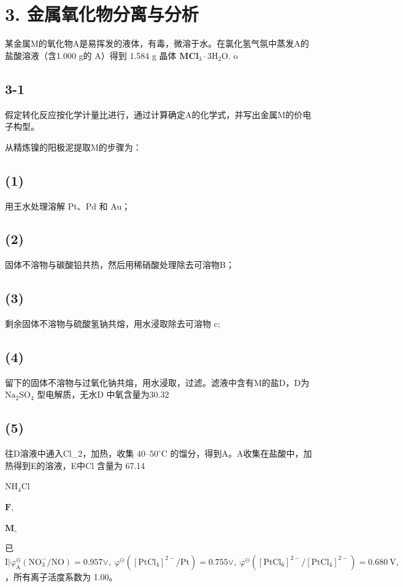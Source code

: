 \section*{3. 金属氧化物分离与分析}
某⾦属M的氧化物A是易挥发的液体，有毒，微溶于⽔。在氯化氢⽓氛中蒸发A的盐酸溶液（含1.000 g的 A）得到 1.584 g 晶体 $\mathbf { M C l } _ { 3 } { \cdot } 3 \mathrm { H } _ { 2 } \mathrm { O } .$ o

\subsection*{3-1}
假定转化反应按化学计量⽐进⾏，通过计算确定A的化学式，并写出⾦属M的价电⼦构型。

从精炼镍的阳极泥提取M的步骤为：

\subsection*{(1)}
⽤王⽔处理溶解 Pt、Pd 和 Au；

\subsection*{(2)}
固体不溶物与碳酸铅共热，然后⽤稀硝酸处理除去可溶物B；

\subsection*{(3)}
剩余固体不溶物与硫酸氢钠共熔，⽤⽔浸取除去可溶物 $\mathrm { c } ;$

\subsection*{(4)}
留下的固体不溶物与过氧化钠共熔，⽤⽔浸取，过滤。滤液中含有M的盐D，D为 $\mathrm { N a _ { 2 } S O _ { 4 } }$ 型电解质，⽆⽔D 中氧含量为30.32%

\subsection*{(5)}
往D溶液中通⼊Cl_{2}，加热，收集 $4 0 – 5 0 ^ { \circ } \mathrm { C }$ 的馏分，得到A。A收集在盐酸中，加热得到E的溶液，E中Cl 含量为 67.14%

$
\mathrm{NH} _ {4} \mathrm{Cl}
$

$
\mathbf {F},
$

$
\mathbf {M} _ {\circ}
$

已 $\mathrm { I | \varphi _ { A } ^ { \ominus } ( N O _ { 3 } ^ { - } / N O ) = 0 . 9 5 7 \vee , ~ \varphi ^ { \ominus } ( [ P t C l _ { 4 } ] ^ { 2 - } / P t ) = 0 . 7 5 5 \vee , ~ \varphi ^ { \ominus } ( [ P t C l _ { 6 } ] ^ { 2 - } / [ P t C l _ { 4 } ] ^ { 2 - } ) = 0 . 6 8 0 ~ V , }$ ，所有离⼦活度系数为 1.00。

